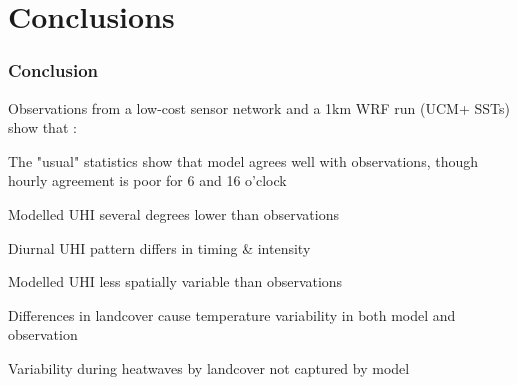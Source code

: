 \documentclass[aspectratio=169, 10pt]{beamer}
\begin{document}
\section{Conclusions} 

\begin{frame}
\frametitle{Conclusion}
Observations from a low-cost sensor network and a 1km WRF run (UCM+ SSTs) show that : 
\begin{itemize}
\large{
\item The "usual" statistics show that model agrees well with observations, though hourly agreement is poor for 6 and 16 o'clock
\item Modelled UHI several degrees lower than observations
\item Diurnal UHI pattern differs in timing \& intensity
\item Modelled UHI less spatially variable than observations 
\item Differences in landcover cause temperature variability in both model and observation
\item Variability during heatwaves by landcover not captured by model
}
\end{itemize}


%
\end{frame}
%
%
%
%
 
\end{document}
